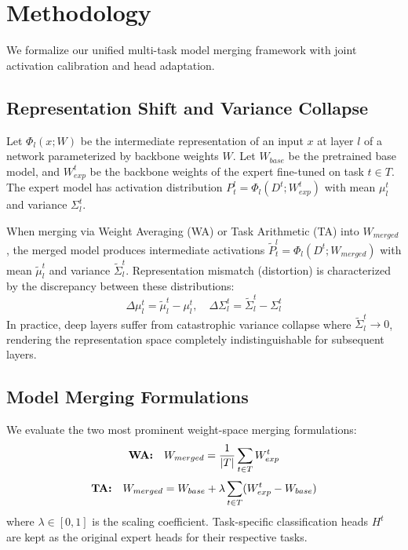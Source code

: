 \documentclass{article}
\theoremstyle{plain}
\theoremstyle{definition}
\theoremstyle{remark}
\begin{document}
\section{Methodology}
\label{sec:methodology}

We formalize our unified multi-task model merging framework with joint activation calibration and head adaptation.

\subsection{Representation Shift and Variance Collapse}
Let $\Phi_l(x; W)$ be the intermediate representation of an input $x$ at layer $l$ of a network parameterized by backbone weights $W$. Let $W_{base}$ be the pretrained base model, and $W_{exp}^t$ be the backbone weights of the expert fine-tuned on task $t \in T$. The expert model has activation distribution $P_t^l = \Phi_l(D^t; W_{exp}^t)$ with mean $\mu_l^t$ and variance $\Sigma_l^t$.

When merging via Weight Averaging (WA) or Task Arithmetic (TA) into $W_{merged}$, the merged model produces intermediate activations $\tilde{P}_t^l = \Phi_l(D^t; W_{merged})$ with mean $\tilde{\mu}_l^t$ and variance $\tilde{\Sigma}_l^t$. Representation mismatch (distortion) is characterized by the discrepancy between these distributions:
\begin{equation}
    \Delta \mu_l^t = \tilde{\mu}_l^t - \mu_l^t, \quad \Delta \Sigma_l^t = \tilde{\Sigma}_l^t - \Sigma_l^t
\end{equation}
In practice, deep layers suffer from catastrophic variance collapse where $\tilde{\Sigma}_l^t \to 0$, rendering the representation space completely indistinguishable for subsequent layers.

\subsection{Model Merging Formulations}
We evaluate the two most prominent weight-space merging formulations:
\begin{equation}
    \text{\textbf{WA:}} \quad W_{merged} = \frac{1}{|T|} \sum_{t \in T} W_{exp}^t
\end{equation}
\begin{equation}
    \text{\textbf{TA:}} \quad W_{merged} = W_{base} + \lambda \sum_{t \in T} (W_{exp}^t - W_{base})
\end{equation}
where $\lambda \in [0, 1]$ is the scaling coefficient. Task-specific classification heads $H^t$ are kept as the original expert heads for their respective tasks.
\end{document}
